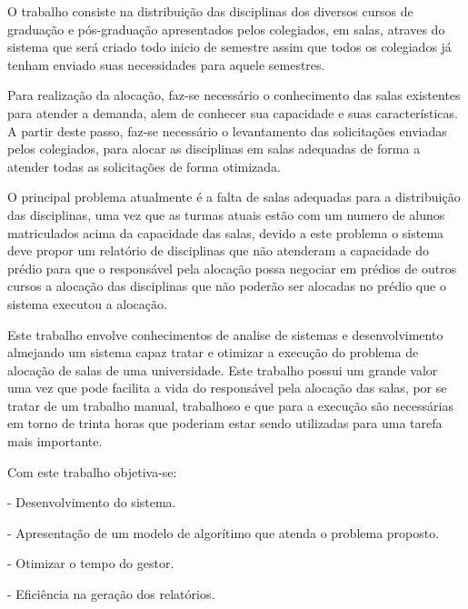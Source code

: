 \sumario
{}

\iniciocapitulo

O trabalho consiste na distribuição das disciplinas dos diversos cursos de graduação e pós-graduação apresentados pelos colegiados, em salas, atraves do sistema que será criado todo inicio de semestre assim que todos os colegiados já tenham enviado suas necessidades para aquele semestres.\par

Para realização da alocação, faz-se necessário o conhecimento das salas existentes para atender a demanda, alem de conhecer sua capacidade e suas características. A partir deste passo, faz-se necessário o levantamento das solicitações enviadas pelos colegiados, para alocar as disciplinas em salas adequadas de forma a atender todas as solicitações de forma otimizada.\par

O principal problema atualmente é a falta de salas adequadas para a distribuição das disciplinas, uma vez que as turmas atuais estão com um numero de alunos matriculados acima da capacidade das salas, devido a este problema o sistema deve propor um relatório de disciplinas que não atenderam a capacidade do prédio para que o responsável pela alocação possa negociar em prédios de outros cursos a alocação das disciplinas que não poderão ser alocadas no prédio que o sistema executou a alocação.\par



	Este trabalho envolve conhecimentos de analise de sistemas e desenvolvimento almejando um sistema capaz tratar e otimizar a execução do problema de alocação de salas de uma universidade. Este trabalho possui um grande valor uma vez que pode facilita a vida do responsável pela alocação das salas, por se tratar de um trabalho manual, trabalhoso e que para a execução são necessárias em torno de trinta horas que poderiam estar sendo utilizadas para uma tarefa mais importante.\par

Com este trabalho objetiva-se:\par

	- Desenvolvimento do sistema.\par
	- Apresentação de um modelo de algorítimo que atenda o problema proposto.\par
	- Otimizar o tempo do gestor.\par
	- Eficiência na geração dos relatórios.\par

